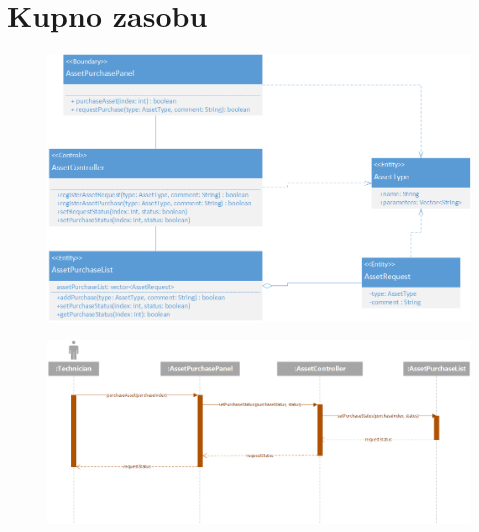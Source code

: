 \documentclass[11pt, a4paper, oneside]{report}
\begin{document}
\section{Kupno zasobu}
\begin{figure}[H]
\centering
\includegraphics[scale=0.5]{kupno_zasob_class.png}
\end{figure}
\begin{figure}[H]
\centering
\includegraphics[scale=0.5]{kupno_zasob_sequence.png}
\end{figure}
\end{document}
